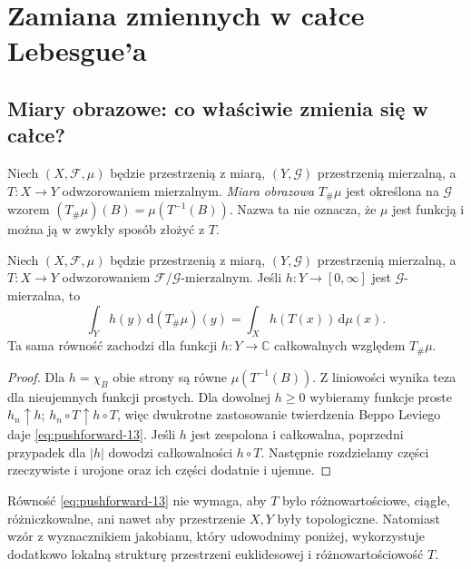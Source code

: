 \chapter{Zamiana zmiennych w całce Lebesgue'a}
\label{ch:zamiana-zmiennych}

\providecommand{\atlasref}[2]{#2}


\section{Miary obrazowe: co właściwie zmienia się w całce?}
Niech $(X,\mathcal F,\mu)$ będzie przestrzenią z miarą, $(Y,\mathcal G)$
przestrzenią mierzalną, a $T:X\to Y$ odwzorowaniem mierzalnym.
\emph{Miara obrazowa} $T_\#\mu$ jest określona na $\mathcal G$ wzorem
$(T_\#\mu)(B)=\mu(T^{-1}(B))$. Nazwa ta nie oznacza, że
$\mu$ jest funkcją i można ją w zwykły sposób złożyć z $T$.

\begin{twierdzenie}
\label{thm:pushforward-integral-13}
Niech $(X,\mathcal F,\mu)$ będzie przestrzenią z miarą,
$(Y,\mathcal G)$ przestrzenią mierzalną, a
$T:X\to Y$ odwzorowaniem $\mathcal F/\mathcal G$-mierzalnym.
Jeśli $h:Y\to[0,\infty]$ jest $\mathcal G$-mierzalna, to
\begin{equation}\label{eq:pushforward-13}
\int_Y h(y)\,\mathrm d(T_\#\mu)(y)
=\int_X h(T(x))\,\mathrm d\mu(x).
\end{equation}
Ta sama równość zachodzi dla funkcji $h:Y\to\mathbb C$
całkowalnych względem $T_\#\mu$.
\end{twierdzenie}
\begin{proof}
Dla $h=\chi_B$ obie strony są równe $\mu(T^{-1}(B))$.
Z liniowości wynika teza dla nieujemnych funkcji prostych.
Dla dowolnej $h\ge0$ wybieramy funkcje proste $h_n\uparrow h$;
$h_n\circ T\uparrow h\circ T$, więc dwukrotne zastosowanie
twierdzenia Beppo Leviego daje \eqref{eq:pushforward-13}.
Jeśli $h$ jest zespolona i całkowalna, poprzedni przypadek dla
$|h|$ dowodzi całkowalności $h\circ T$. Następnie rozdzielamy
części rzeczywiste i urojone oraz ich części dodatnie i ujemne.
\end{proof}

\begin{uwaga}
Równość \eqref{eq:pushforward-13} nie wymaga, aby $T$ było
różnowartościowe, ciągłe, różniczkowalne, ani nawet aby przestrzenie
$X,Y$ były topologiczne. Natomiast wzór z wyznacznikiem jakobianu,
który udowodnimy poniżej, wykorzystuje dodatkowo lokalną strukturę
przestrzeni euklidesowej i różnowartościowość $T$.
\end{uwaga}

